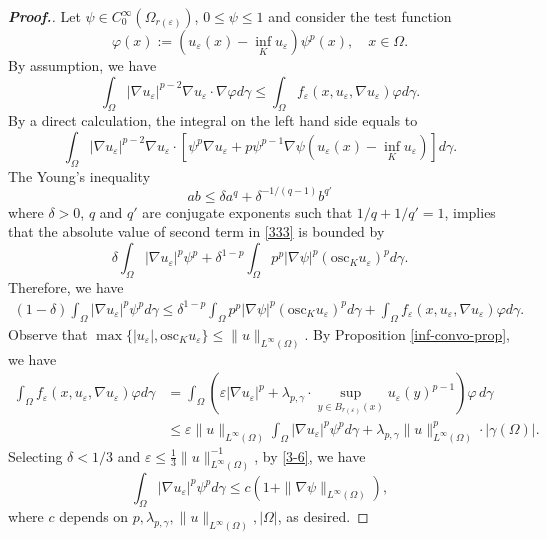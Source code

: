 \documentclass[12pt]{amsart}
\newcommand{\1}{\mathbf 1}
\begin{document}
\begin{proof}[\bf Proof.]
Let $\psi \in C^{\infty}_0(\Omega_{r(\varepsilon)})$, $0\leq\psi\leq1$ and consider the test function
\[
\varphi(x):=(u_\varepsilon(x)-{\inf}_{K} u_\varepsilon  )\psi^p(x),\quad x\in \Omega.
\]
By assumption, we have
\[
\int_{\Omega}|\nabla u_\varepsilon|^{p-2}\nabla u_\varepsilon\cdot \nabla \varphi d\gamma \leq \int_\Omega  f_\varepsilon(x,u_\varepsilon,\nabla u_\varepsilon)\varphi d\gamma .
\]
By a direct calculation, the integral on the left hand side equals to
\begin{equation}\label{333}
\int_{\Omega} |\nabla u_\varepsilon|^{p-2}\nabla u_\varepsilon \cdot[ \psi^p \nabla u_\varepsilon+p\psi^{p-1}\nabla \psi ( u_\varepsilon(x)-{\inf}_{K} u_\varepsilon)]d\gamma.
\end{equation}
The Young's inequality
\[
ab \leq \delta a^q+\delta^{-1/(q-1)} b^{q'}
\]
where $\delta>0$, $q$ and $q'$ are conjugate exponents such that $1/q+1/q'=1$, implies that the absolute value of second term in \eqref{333} is bounded by
\[
\delta \int_\Omega |\nabla u_\varepsilon|^p \psi^p +\delta^{1-p} \int_\Omega p^p |\nabla \psi|^p (\mathrm{osc}_K u_\varepsilon)^pd\gamma.
\]
Therefore, we have
\begin{align}\label{3-6}
(1-\delta)\int_\Omega |\nabla u_\varepsilon|^p \psi^pd\gamma  \leq  \delta^{1-p}\int_\Omega p^p |\nabla \psi|^p (\mathrm{osc}_K u_\varepsilon)^pd\gamma+\int_\Omega  f_\varepsilon(x,u_\varepsilon,\nabla u_\varepsilon)\varphi d\gamma.
\end{align}
Observe that $\max\{|u_\varepsilon|, \mathrm{osc}_K u_\varepsilon\}\leq \|u\|_{L^{\infty}(\Omega)}$. By Proposition \ref{inf-convo-prop}, we have
\begin{align*}
\int_\Omega  f_\varepsilon(x,u_\varepsilon,\nabla u_\varepsilon)\varphi d\gamma&=\int_\Omega  (\varepsilon |\nabla u_\varepsilon|^p+\lambda_{p,\gamma}\cdot{\sup}_{y\in B_{r(\varepsilon)}(x)} u_\varepsilon(y)^{p-1} )\varphi\,d\gamma\\
& \leq \varepsilon\|u\|_{L^{\infty}(\Omega)}\int_\Omega |\nabla u_\varepsilon|^p  \psi^p  d\gamma+\lambda_{p,\gamma}\|u\|^p_{L^{\infty}(\Omega)}\cdot |\gamma(\Omega)|.
\end{align*}
Selecting $\delta <1/3$ and $\varepsilon\leq \frac{1}{3}\|u\|^{-1}_{L^{\infty}(\Omega)}$, by \eqref{3-6}, we have
\[
\int_\Omega |\nabla u_\varepsilon|^p \psi^pd\gamma  \leq c(1+\|\nabla \psi\|_{L^{\infty}(\Omega)}),
\]
where $c$ depends on $p,\lambda_{p,\gamma},\|u\|_{L^{\infty}(\Omega)},|\Omega|$, as desired.
\end{proof}
\end{document}
